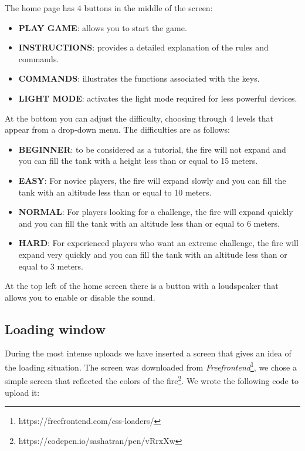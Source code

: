 \documentclass{article}
\begin{document}
The home page has 4 buttons in the middle of the screen: 
\begin{itemize}
\item \textbf{PLAY GAME}: allows you to start the game.
\item \textbf{INSTRUCTIONS}: provides a detailed explanation of the rules and commands.
\item \textbf{COMMANDS}: illustrates the functions associated with the keys.
\item \textbf{LIGHT MODE}: activates the light mode required for less powerful devices.
\end{itemize}
At the bottom you can adjust the difficulty, choosing through 4 levels that appear from a drop-down menu. The difficulties are as follows:
\begin{itemize}
\item \textbf{BEGINNER}: to be considered as a tutorial, the fire will not expand and you can fill the tank with a height less than or equal to 15 meters.
\item \textbf{EASY}: For novice players, the fire will expand slowly and you can fill the tank with an altitude less than or equal to 10 meters.
\item \textbf{NORMAL}: For players looking for a challenge, the fire will expand quickly and you can fill the tank with an altitude less than or equal to 6 meters.
\item \textbf{HARD}: For experienced players who want an extreme challenge, the fire will expand very quickly and you can fill the tank with an altitude less than or equal to 3 meters.
\end{itemize}
At the top left of the home screen there is a button with a loudspeaker that allows you to enable or disable the sound.

\subsection*{Loading window}
During the most intense uploads we have inserted a screen that gives an idea of the loading situation. The screen was downloaded from \textit{Freefrontend}\footnote{https://freefrontend.com/css-loaders/}, we chose a simple screen that reflected the colors of the fire\footnote{https://codepen.io/sashatran/pen/vRrxXw}. We wrote the following code to upload it:
\end{document}
